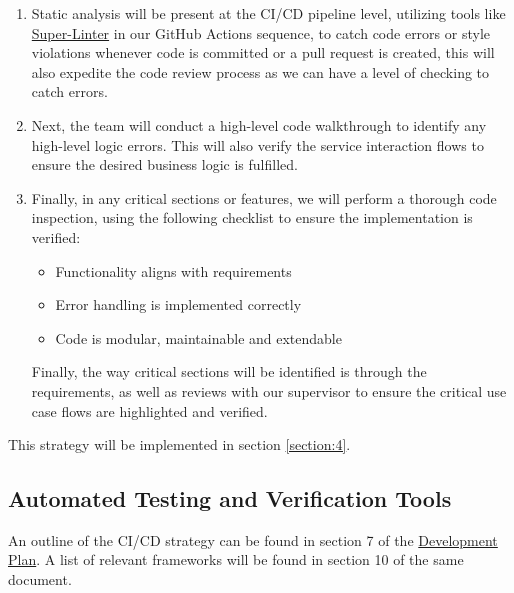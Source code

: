 \documentclass[12pt, titlepage]{article}
\begin{document}
\begin{enumerate}
  \item Static analysis will be present at the CI/CD pipeline level, utilizing tools like \href{https://github.com/super-linter/super-linter}{Super-Linter} in our GitHub Actions sequence, to catch code errors or style violations whenever code is committed or a pull request is created, this will also expedite the code review process as we can have a level of checking to catch errors.
  \item Next, the team will conduct a high-level code walkthrough to identify any high-level logic errors. This will also verify the service interaction flows to ensure the desired business logic is fulfilled.
  \item Finally, in any critical sections or features, we will perform a thorough code inspection, using the following checklist to ensure the implementation is verified:
    \begin{itemize}
      \item Functionality aligns with requirements
      \item Error handling is implemented correctly
      \item Code is modular, maintainable and extendable
    \end{itemize}

  Finally, the way critical sections will be identified is through the requirements, as well as reviews with our supervisor to ensure the critical use case flows are highlighted and verified.
\end{enumerate}

This strategy will be implemented in section \ref{section:4}.

\subsection{Automated Testing and Verification Tools} \label{section:3.6}

An outline of the CI/CD strategy can be found in section 7 of the \href{https://github.com/Inreet-Kaur/capstone/blob/main/docs/DevelopmentPlan/DevelopmentPlan.pdf}{Development Plan}. A list of relevant frameworks will be found in section 10 of the same document.
\end{document}
